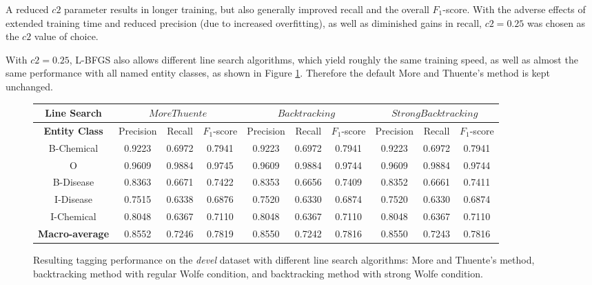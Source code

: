 \documentclass[10pt, oneside]{article}
\begin{document}
A reduced $c2$ parameter results in longer training, but also generally improved recall and the overall $F_1$-score. With the adverse effects of extended training time and reduced precision (due to increased overfitting), as well as diminished gains in recall, $c2=0.25$ was chosen as the $c2$ value of choice.

With $c2=0.25$, L-BFGS also allows different line search algorithms, which yield roughly the same training speed, as well as almost the same performance with all named entity classes, as shown in Figure \ref{fig:linesearch}. Therefore the default More and Thuente's method is kept unchanged.

\begin{figure}[h]
\begin{center}
\fontsize{9}{11}\selectfont
\begin{tabular}{|*{10}{c|}}\hline
\textbf{Line Search}  & \multicolumn{3}{c|}{$MoreThuente$} & \multicolumn{3}{c|}{$Backtracking$} & \multicolumn{3}{c|}{$StrongBacktracking$}  \\ \hline 
\textbf{Entity Class} & Precision & Recall & $F_1$-score & Precision & Recall & $F_1$-score & Precision & Recall & $F_1$-score \\ \hline
B-Chemical & 0.9223 & 0.6972 & 0.7941 & 0.9223 & 0.6972 & 0.7941 & 0.9223 & 0.6972 & 0.7941 \\ \hline
O                 & 0.9609 & 0.9884 & 0.9745 & 0.9609 & 0.9884 & 0.9744 & 0.9609 & 0.9884 & 0.9744 \\ \hline
B-Disease   & 0.8363 & 0.6671 & 0.7422 & 0.8353 & 0.6656 & 0.7409 & 0.8352 & 0.6661 & 0.7411 \\ \hline
I-Disease    & 0.7515 & 0.6338 & 0.6876 & 0.7520 & 0.6330 & 0.6874 & 0.7520 & 0.6330 & 0.6874 \\ \hline
I-Chemical  & 0.8048 & 0.6367 & 0.7110 & 0.8048 & 0.6367 & 0.7110 & 0.8048 & 0.6367 & 0.7110 \\ \hline
\textbf{Macro-average} & 0.8552 & 0.7246 & 0.7819 & 0.8550 & 0.7242 & 0.7816 & 0.8550 & 0.7243 & 0.7816 \\ \hline
\end{tabular}
\caption{\label{fig:linesearch} Resulting tagging performance on the \emph{devel} dataset with different line search algorithms: More and Thuente's method, backtracking method with regular Wolfe condition, and backtracking method with strong Wolfe condition.}
\end{center}
\end{figure}




\footnotesize{}
\end{document}
